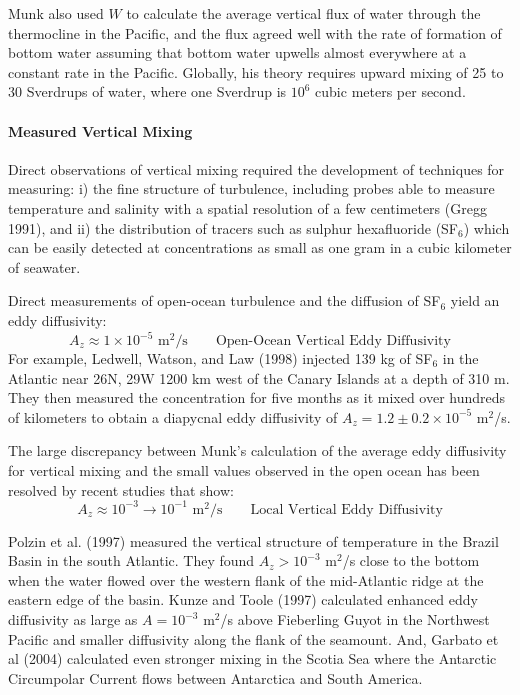 Munk also used $W$ to calculate the average vertical flux of water
through the thermocline in the Pacific, and the flux agreed well with
the rate of formation of bottom water assuming that bottom water
upwells almost everywhere at a constant rate in the Pacific. Globally,
his theory requires upward mixing of 25 to 30 Sverdrups of water,
where one Sverdrup is $10^6$ cubic meters per second.

\paragraph{Measured Vertical Mixing}
Direct observations of vertical mixing
required the development of techniques for measuring: i) the fine
structure of turbulence, including
probes able to measure temperature and salinity with a spatial
resolution of a few centimeters (Gregg 1991), and ii) the distribution
of tracers such as sulphur hexafluoride (SF$_6$) which can be easily
detected at concentrations as small as one gram in a cubic kilometer
of seawater.

Direct measurements of open-ocean
turbulence and the diffusion of
SF$_6$ yield an eddy diffusivity:
\begin{equation}
A_z \approx 1 \times 10^{-5} \text{ m$^2$/s} \qquad \text{Open-Ocean Vertical
Eddy Diffusivity}
\end{equation}
For example, Ledwell, Watson, and Law (1998) injected 139 kg of SF$_6$
in the Atlantic near 26\degrees N, 29\degrees W 1200 km west of the
Canary Islands at a depth of 310 m. They then measured the
concentration for five months as it mixed over hundreds of kilometers
to obtain a diapycnal eddy
diffusivity of
$A_z = 1.2 \pm 0.2 \times 10^{-5}$ m$^2$/s.

The large discrepancy between Munk's calculation of the average eddy
diffusivity for vertical mixing and the small values observed in the
open ocean has been resolved by recent studies that show:
\begin{equation}
A_z \approx 10^{-3} \to 10^{-1} \text{ m$^2$/s} \qquad \text{Local Vertical Eddy Diffusivity}
\end{equation}

Polzin et al. (1997) measured the vertical structure of temperature in
the Brazil Basin in the south Atlantic. They found $A_z > 10^{-3}$
m$^2$/s close to the bottom when the water flowed over the western
flank of the mid-Atlantic ridge at the eastern edge of the
basin. Kunze and Toole (1997) calculated enhanced eddy diffusivity as
large as $A= 10^{-3}$ m$^2$/s above Fieberling Guyot in the Northwest
Pacific and smaller diffusivity along the flank of the seamount. And,
Garbato et al (2004) calculated even stronger mixing in the Scotia Sea
where the Antarctic Circumpolar Current flows between Antarctica and
South America.

